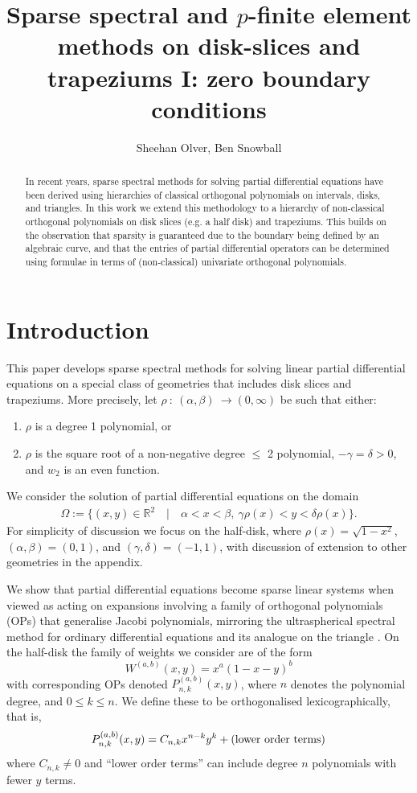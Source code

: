 \documentclass[11pt, oneside]{article}   	%
\title{Sparse spectral and $p$-finite element methods on disk-slices and trapeziums I: zero boundary conditions}
\author{Sheehan Olver, Ben Snowball}
\newcommand{\R}{\mathbb{R}}
\begin{document}
\maketitle

\begin{abstract}
In recent years, sparse spectral methods for solving partial differential equations have been derived using hierarchies of classical orthogonal polynomials on intervals, disks, and triangles. In this work we extend this methodology to a hierarchy of non-classical orthogonal polynomials on disk slices (e.g. a half disk) and trapeziums. This builds on the observation that sparsity is guaranteed due to the boundary being defined by an algebraic curve, and that the entries of partial differential operators can be determined using formulae in terms of (non-classical) univariate orthogonal polynomials. 
\end{abstract}


%
\section{Introduction}

This paper develops sparse spectral methods for solving linear partial differential equations on a special class of geometries that includes disk slices and trapeziums.  
More precisely, let  \(\rho \: : \: (\alpha,\beta) \: \to (0,\infty)\) be such that either:

\begin{enumerate}
\item  \(\rho\) is a degree 1 polynomial, or 
\item \(\rho\) is the square root of a non-negative degree \(\le\) 2 polynomial, \(-\gamma = \delta > 0\), and \(w_2\) is an even function.
\end{enumerate}

We consider the solution of partial differential equations on the domain
\begin{align}
\Omega := \{(x,y) \in \R^2 \quad | \quad \alpha < x < \beta, \: \gamma \rho(x) < y < \delta \rho(x)\}.
\end{align}
For simplicity of discussion we focus on the half-disk, where $\rho(x) = \sqrt{1-x^2}$,  $(\alpha,\beta) = (0, 1)$, and  $(\gamma, \delta)  = (-1,1)$, with discussion of extension to other geometries in the appendix. 


We show that partial differential equations become sparse linear systems when viewed as acting on expansions involving a family of orthogonal polynomials (OPs) that  generalise Jacobi polynomials, mirroring the ultraspherical spectral method for ordinary differential equations \cite{olver2013fast} and its analogue on the triangle \cite{olver2018recurrence,olver2019triangle}.  On the half-disk the family of weights we consider are of the form
$$
W^{(a,b)}(x,y) = x^a (1-x-y)^b
$$
with corresponding OPs denoted $P_{n,k}^{(a,b)}(x,y)$, where $n$ denotes the polynomial degree, and $0 \le k \le n$. We define these to be orthogonalised lexicographically, that is,
$$
P_{n,k}^{(a,b)}(x,y) = C_{n,k} x^{n-k} y^k + (\hbox{lower order terms})
$$
where $C_{n,k} \neq 0$ and ``lower order terms'' can  include degree $n$ polynomials with fewer $y$ terms.
\end{document}
